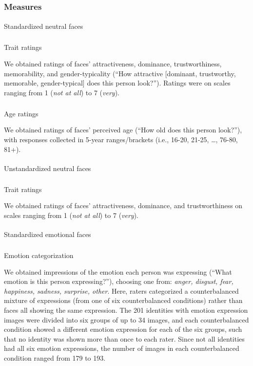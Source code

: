 \documentclass[
  letterpaper,
  DIV=11,
  numbers=noendperiod]{scrartcl}
\makeatletter
\let\oldparagraph\paragraph
\renewcommand{\paragraph}{
    \@ifstar
      \xxxParagraphStar
      \xxxParagraphNoStar
  }
\newcommand{\xxxParagraphStar}[1]{\oldparagraph*{#1}\mbox{}}
\newcommand{\xxxParagraphNoStar}[1]{\oldparagraph{#1}\mbox{}}
\let\oldsubparagraph\subparagraph
\renewcommand{\subparagraph}{
    \@ifstar
      \xxxSubParagraphStar
      \xxxSubParagraphNoStar
  }
\newcommand{\xxxSubParagraphStar}[1]{\oldsubparagraph*{#1}\mbox{}}
\newcommand{\xxxSubParagraphNoStar}[1]{\oldsubparagraph{#1}\mbox{}}
\makeatother
\begin{document}
\subsubsection{Measures}\label{measures}

\paragraph{Standardized neutral faces}\label{standardized-neutral-faces}

\subparagraph{Trait ratings}\label{trait-ratings}

We obtained ratings of faces' attractiveness, dominance,
trustworthiness, memorability, and gender-typicality (``How attractive
{[}dominant, trustworthy, memorable, gender-typical{]} does this person
look?''). Ratings were on scales ranging from 1 (\emph{not at all}) to 7
(\emph{very}).

\subparagraph{Age ratings}\label{age-ratings}

We obtained ratings of faces' perceived age (``How old does this person
look?''), with responses collected in 5-year ranges/brackets (i.e.,
16-20, 21-25, \ldots, 76-80, 81+).

\paragraph{Unstandardized neutral
faces}\label{unstandardized-neutral-faces}

\subparagraph{Trait ratings}\label{trait-ratings-1}

We obtained ratings of faces' attractiveness, dominance, and
trustworthiness on scales ranging from 1 (\emph{not at all}) to 7
(\emph{very}).

\paragraph{Standardized emotional
faces}\label{standardized-emotional-faces}

\subparagraph{Emotion categorization}\label{emotion-categorization}

We obtained impressions of the emotion each person was expressing
(``What emotion is this person expressing?''), choosing one from:
\emph{anger, disgust, fear, happiness, sadness, surprise, other}. Here,
raters categorized a counterbalanced mixture of expressions (from one of
six counterbalanced conditions) rather than faces all showing the same
expression. The 201 identities with emotion expression images were
divided into six groups of up to 34 images, and each counterbalanced
condition showed a different emotion expression for each of the six
groups, such that no identity was shown more than once to each rater.
Since not all identities had all six emotion expressions, the number of
images in each counterbalanced condition ranged from 179 to 193.
\end{document}
